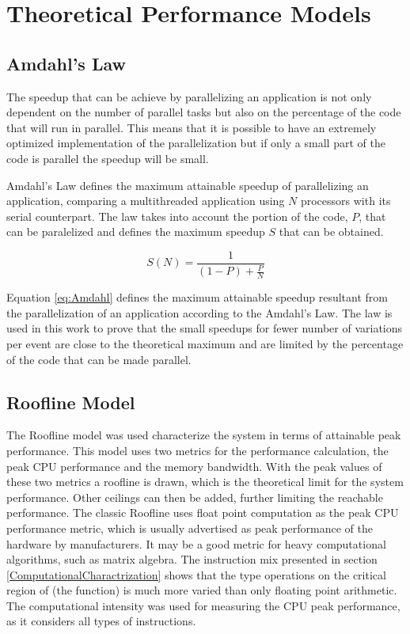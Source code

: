 \chapter{Theoretical Performance Models}

\section*{Amdahl's Law}
\label{AmdahlsLaw}

The speedup that can be achieve by parallelizing an application is not only dependent on the number of parallel tasks but also on the percentage of the code that will run in parallel. This means that it is possible to have an extremely optimized implementation of the parallelization but if only a small part of the code is parallel the speedup will be small.

Amdahl's Law \cite{AMDAHL} defines the maximum attainable speedup of parallelizing an application, comparing a multithreaded application using $N$ processors with its serial counterpart. The law takes into account the portion of the code, $P$, that can be paralelized and defines the maximum speedup $S$ that can be obtained.

\begin{center}
	\begin{equation}
		S(N) = \frac{1}{(1 - P) + \frac{P}{N}}
		\label{eq:Amdahl}
	\end{equation}
\end{center}

Equation \ref{eq:Amdahl} defines the maximum attainable speedup resultant from the parallelization of an application according to the Amdahl's Law. The law is used in this work to prove that the small speedups for fewer number of variations per event are close to the theoretical maximum and are limited by the percentage of the code that can be made parallel.

\section*{Roofline Model}
\label{App:Roofline}

The Roofline model \cite{Roofline} was used characterize the system in terms of attainable peak performance. This model uses two metrics for the performance calculation, the peak CPU performance and the memory bandwidth. With the peak values of these two metrics a roofline is drawn, which is the theoretical limit for the system performance. Other ceilings can then be added, further limiting the reachable performance. The classic Roofline uses float point computation as the peak CPU performance metric, which is usually advertised as peak performance of the hardware by manufacturers. It may be a good metric for heavy computational algorithms, such as matrix algebra. The instruction mix presented in section \ref{ComputationalCharactrization} shows that the type operations on the critical region of \tth (the \ttDilepKinFit function) is much more varied than only floating point arithmetic. The computational intensity was used for measuring the CPU peak performance, as it considers all types of instructions.

